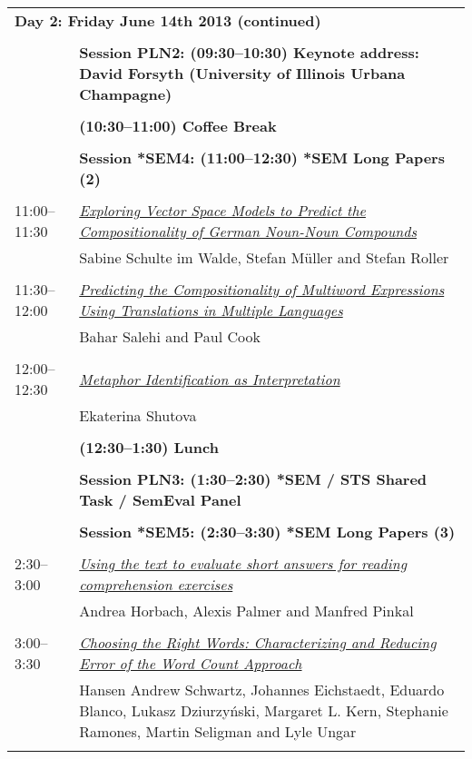 \begin{tabular}{p{20mm}p{138mm}}
\\
\multicolumn{2}{l}{\bf Day 2: Friday June 14th 2013 (continued)} \\\\
 & {\bf Session PLN2: (09:30--10:30) Keynote address: David Forsyth (University of Illinois Urbana Champagne)} \\
\\
 & {\bf (10:30--11:00) Coffee Break} \\
\\
 & {\bf Session *SEM4: (11:00--12:30) *SEM Long Papers (2)} \\
\\
11:00--11:30 & \hyperlink{page.254}{\em Exploring Vector Space Models to Predict the Compositionality of German Noun-Noun Compounds}\\
         & Sabine Schulte im Walde, Stefan M\"{u}ller and Stefan Roller \\
\\

11:30--12:00 & \hyperlink{page.265}{\em Predicting the Compositionality of Multiword Expressions Using Translations in Multiple Languages}\\
         & Bahar Salehi and Paul Cook \\
\\

12:00--12:30 & \hyperlink{page.275}{\em Metaphor Identification as Interpretation}\\
         & Ekaterina Shutova \\
\\

 & {\bf (12:30--1:30) Lunch} \\
\\
 & {\bf Session PLN3: (1:30--2:30) *SEM / STS Shared Task / SemEval Panel} \\
\\
 & {\bf Session *SEM5: (2:30--3:30) *SEM Long Papers (3)} \\
\\
2:30--3:00 & \hyperlink{page.285}{\em Using the text to evaluate short answers for reading comprehension exercises}\\
         & Andrea Horbach, Alexis Palmer and Manfred Pinkal \\
\\

3:00--3:30 & \hyperlink{page.295}{\em Choosing the Right Words: Characterizing and Reducing Error of the Word Count Approach}\\
         & Hansen Andrew Schwartz, Johannes Eichstaedt, Eduardo Blanco, Lukasz Dziurzyński, Margaret L. Kern, Stephanie Ramones, Martin Seligman and Lyle Ungar \\
\\

\end{tabular}
